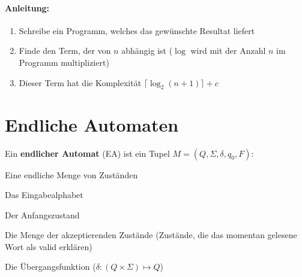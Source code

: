 \documentclass[11pt]{article}
\begin{document}
\paragraph{Anleitung:}
\begin{enumerate}[noitemsep]
	\item Schreibe ein Programm, welches das gew{\"u}nschte Resultat liefert
	\item Finde den Term, der von $n$ abh{\"a}ngig ist ($\log$ wird mit der Anzahl $n$ im Programm multipliziert)
	\item Dieser Term hat die Komplexit{\"a}t $\lceil \log_2(n + 1) \rceil + c$
\end{enumerate}

\section{Endliche Automaten}

Ein \textbf{endlicher Automat} (EA) ist ein Tupel $M = (Q, \Sigma, \delta, q_0, F)$:
\begin{description}[labelindent=16pt,style=multiline,leftmargin=2.5cm, noitemsep]
	\item[$Q$:] Eine endliche Menge von Zust{\"a}nden
	\item[$\Sigma$:] Das Eingabealphabet
	\item[$q_0 \in Q$:] Der Anfangszustand
	\item[$F \subseteq Q$:] Die Menge der akzeptierenden Zust{\"a}nde (Zust{\"a}nde, die das momentan gelesene Wort als valid erkl{\"a}ren)
	\item[$\delta$:] Die {\"U}bergangsfunktion ($\delta: (Q\times\Sigma) \mapsto Q$)
\end{description}
\end{document}
